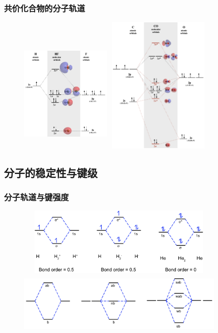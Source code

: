 \frame
{
	\frametitle{共价化合物的分子轨道}
\begin{figure}[h!]
\centering
\vspace{-5.5pt}
\includegraphics[height=2.30in,width=1.75in,viewport=0 0 400 460,clip]{Figures/Molecular-orbital-diagram-of-HF.png}
\includegraphics[height=2.65in,width=2.05in,viewport=0 0 560 750,clip]{Figures/Molecular-orbital-diagram-of-CO.png}
\label{MO:HF}
\end{figure}
}

\subsection{分子的稳定性与键级}
\frame
{
	\frametitle{分子轨道与键强度}
\begin{figure}[h!]
\centering
\vspace{-10.5pt}
\includegraphics[height=1.30in,width=4.00in,viewport=0 0 325 110,clip]{Figures/MO-diagrams_H2He2.png}
\includegraphics[height=1.20in,width=4.00in,viewport=0 0 360 100,clip]{Figures/multi-orbital.png}
\label{MO:H2-He}
\end{figure}
}

